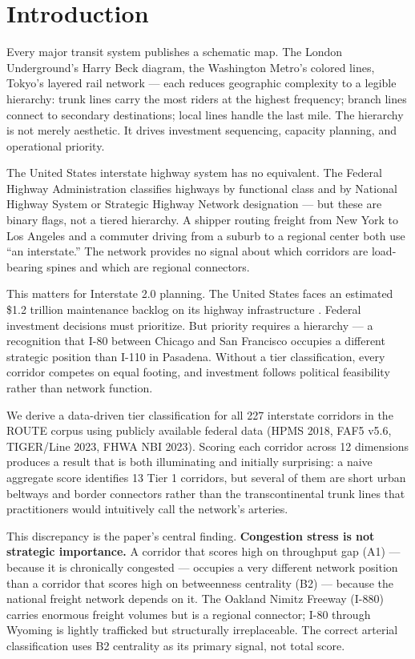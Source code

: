 \section{Introduction}

Every major transit system publishes a schematic map. The London Underground's Harry Beck diagram, the Washington Metro's colored lines, Tokyo's layered rail network --- each reduces geographic complexity to a legible hierarchy: trunk lines carry the most riders at the highest frequency; branch lines connect to secondary destinations; local lines handle the last mile. The hierarchy is not merely aesthetic. It drives investment sequencing, capacity planning, and operational priority.

The United States interstate highway system has no equivalent. The Federal Highway Administration classifies highways by functional class and by National Highway System or Strategic Highway Network designation --- but these are binary flags, not a tiered hierarchy. A shipper routing freight from New York to Los Angeles and a commuter driving from a suburb to a regional center both use ``an interstate.'' The network provides no signal about which corridors are load-bearing spines and which are regional connectors.

This matters for Interstate 2.0 planning. The United States faces an estimated \$1.2 trillion maintenance backlog on its highway infrastructure \citep{ASCE2021}. Federal investment decisions must prioritize. But priority requires a hierarchy --- a recognition that I-80 between Chicago and San Francisco occupies a different strategic position than I-110 in Pasadena. Without a tier classification, every corridor competes on equal footing, and investment follows political feasibility rather than network function.

We derive a data-driven tier classification for all 227 interstate corridors in the ROUTE corpus using publicly available federal data (HPMS 2018, FAF5 v5.6, TIGER/Line 2023, FHWA NBI 2023). Scoring each corridor across 12 dimensions produces a result that is both illuminating and initially surprising: a naive aggregate score identifies 13 Tier 1 corridors, but several of them are short urban beltways and border connectors rather than the transcontinental trunk lines that practitioners would intuitively call the network's arteries.

This discrepancy is the paper's central finding. \textbf{Congestion stress is not strategic importance.} A corridor that scores high on throughput gap (A1) --- because it is chronically congested --- occupies a very different network position than a corridor that scores high on betweenness centrality (B2) --- because the national freight network depends on it. The Oakland Nimitz Freeway (I-880) carries enormous freight volumes but is a regional connector; I-80 through Wyoming is lightly trafficked but structurally irreplaceable. The correct arterial classification uses B2 centrality as its primary signal, not total score.

